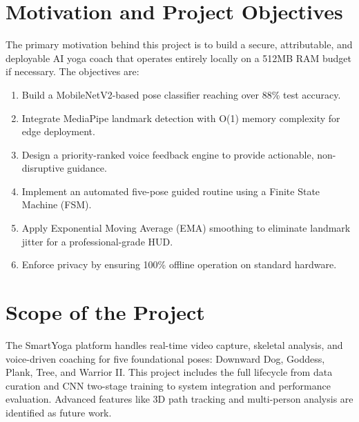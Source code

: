 \section{Motivation and Project Objectives}
The primary motivation behind this project is to build a secure, attributable, and deployable AI yoga coach that operates entirely locally on a 512MB RAM budget if necessary. The objectives are:
\begin{enumerate}
    \item Build a MobileNetV2-based pose classifier reaching over 88\% test accuracy.
    \item Integrate MediaPipe landmark detection with O(1) memory complexity for edge deployment.
    \item Design a priority-ranked voice feedback engine to provide actionable, non-disruptive guidance.
    \item Implement an automated five-pose guided routine using a Finite State Machine (FSM).
    \item Apply Exponential Moving Average (EMA) smoothing to eliminate landmark jitter for a professional-grade HUD.
    \item Enforce privacy by ensuring 100\% offline operation on standard hardware.
\end{enumerate}

\section{Scope of the Project}
The SmartYoga platform handles real-time video capture, skeletal analysis, and voice-driven coaching for five foundational poses: Downward Dog, Goddess, Plank, Tree, and Warrior II. This project includes the full lifecycle from data curation and CNN two-stage training to system integration and performance evaluation. Advanced features like 3D path tracking and multi-person analysis are identified as future work.
